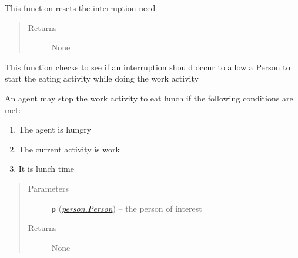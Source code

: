 \documentclass[letterpaper,10pt,english]{sphinxmanual}
\begin{document}
\begin{fulllineitems}
\begin{fulllineitems}
\end{fulllineitems}


\begin{fulllineitems}
\label{interruption:interruption.Interruption.reset_minor}
This function resets the interruption need
\begin{quote}\begin{description}
\item[{Returns}] \leavevmode
None

\end{description}\end{quote}

\end{fulllineitems}


\begin{fulllineitems}
\label{interruption:interruption.Interruption.stop_work_to_eat}
This function checks to see if an interruption should occur to allow a Person to         start the eating activity while doing the work activity

An agent may stop the work activity to eat lunch if the following conditions are met:
\begin{enumerate}
\item {} 
The agent is hungry

\item {} 
The current activity is work

\item {} 
It is lunch time

\end{enumerate}
\begin{quote}\begin{description}
\item[{Parameters}] \leavevmode
\textbf{\texttt{p}} ({\hyperref[person:person.Person]{\emph{\emph{person.Person}}}}) -- the person of interest

\item[{Returns}] \leavevmode
None

\end{description}\end{quote}

\end{fulllineitems}


\end{fulllineitems}
\end{document}
